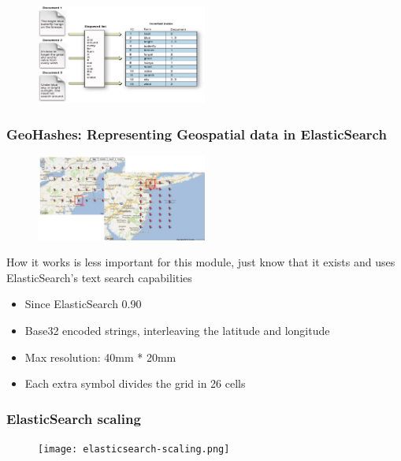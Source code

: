 \documentclass{article}
\begin{document}
\begin{figure}[H]
    \centering
    \includegraphics[width=0.5\textwidth]{inverted-index.png}
\end{figure}


\subsubsection{GeoHashes: Representing Geospatial data in ElasticSearch}

\begin{figure}[H]
    \centering
    \includegraphics[width=0.5\textwidth]{geohashes.jpg}
    \caption{}
\end{figure}

How it works is less important for this module, just know that it exists and uses ElasticSearch's text search capabilities

\begin{itemize}
    \item Since ElasticSearch 0.90
    \item Base32 encoded strings, interleaving the latitude and longitude
    \item Max resolution: 40mm * 20mm
    \item Each extra symbol divides the grid in 26 cells
\end{itemize}

\subsubsection{ElasticSearch scaling}

\begin{figure}[H]
    \centering
    \texttt{[image: elasticsearch-scaling.png]}
    \caption{}
\end{figure}
\end{document}
